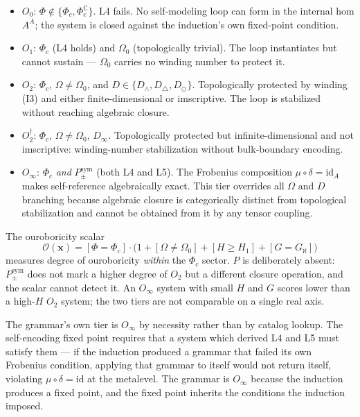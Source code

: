 \documentclass[12pt,a4paper]{article}
\begin{document}
\begin{itemize}
  \item $O_0$: $\Phi \notin \{\Phi_c, \Phi_c^{\mathbb{C}}\}$. L4 fails. No self-modeling loop can form in the internal hom $A^A$; the system is closed against the induction's own fixed-point condition.
  \item $O_1$: $\Phi_c$ (L4 holds) and $\Omega_0$ (topologically trivial). The loop instantiates but cannot sustain --- $\Omega_0$ carries no winding number to protect it.
  \item $O_2$: $\Phi_c$, $\Omega \neq \Omega_0$, and $D \in \{D_{\wedge}, D_{\triangle}, D_{\odot}\}$. Topologically protected by winding (I3) and either finite-dimensional or imscriptive. The loop is stabilized without reaching algebraic closure.
  \item $O_2^{\dagger}$: $\Phi_c$, $\Omega \neq \Omega_0$, $D_{\infty}$. Topologically protected but infinite-dimensional and not imscriptive: winding-number stabilization without bulk-boundary encoding.
  \item $O_{\infty}$: $\Phi_c$ \emph{and} $P_{\pm}^{\text{sym}}$ (both L4 and L5). The Frobenius composition $\mu \circ \delta = \text{id}_{A}$ makes self-reference algebraically exact. This tier overrides all $\Omega$ and $D$ branching because algebraic closure is categorically distinct from topological stabilization and cannot be obtained from it by any tensor coupling.
\end{itemize}

The ouroboricity scalar
$$\mathcal{O}(\mathbf{x}) = [\Phi = \Phi_c] \cdot \bigl(1 + [\Omega \neq \Omega_0] + [H \geq H_1] + [G = G_{\aleph}]\bigr)$$
measures degree of ouroboricity \emph{within} the $\Phi_c$ sector. $P$ is deliberately absent: $P_{\pm}^{\text{sym}}$ does not mark a higher degree of $O_2$ but a different closure operation, and the scalar cannot detect it. An $O_{\infty}$ system with small $H$ and $G$ scores lower than a high-$H$ $O_2$ system; the two tiers are not comparable on a single real axis.

The grammar's own tier is $O_{\infty}$ by necessity rather than by catalog lookup. The self-encoding fixed point requires that a system which derived L4 and L5 must satisfy them --- if the induction produced a grammar that failed its own Frobenius condition, applying that grammar to itself would not return itself, violating $\mu \circ \delta = \text{id}$ at the metalevel. The grammar is $O_{\infty}$ because the induction produces a fixed point, and the fixed point inherits the conditions the induction imposed.
\end{document}
